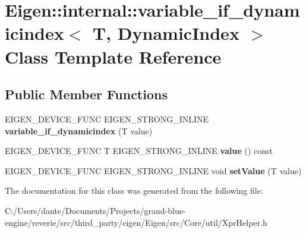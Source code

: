 \hypertarget{class_eigen_1_1internal_1_1variable__if__dynamicindex_3_01_t_00_01_dynamic_index_01_4}{}\section{Eigen\+::internal\+::variable\+\_\+if\+\_\+dynamicindex$<$ T, Dynamic\+Index $>$ Class Template Reference}
\label{class_eigen_1_1internal_1_1variable__if__dynamicindex_3_01_t_00_01_dynamic_index_01_4}
\subsection*{Public Member Functions}
\begin{DoxyCompactItemize}
\item 
\mbox{\label{class_eigen_1_1internal_1_1variable__if__dynamicindex_3_01_t_00_01_dynamic_index_01_4_a8c8e077721a51797efde13a37e49c376}} 
E\+I\+G\+E\+N\+\_\+\+D\+E\+V\+I\+C\+E\+\_\+\+F\+U\+NC E\+I\+G\+E\+N\+\_\+\+S\+T\+R\+O\+N\+G\+\_\+\+I\+N\+L\+I\+NE {\bfseries variable\+\_\+if\+\_\+dynamicindex} (T value)
\item 
\mbox{\label{class_eigen_1_1internal_1_1variable__if__dynamicindex_3_01_t_00_01_dynamic_index_01_4_a355b9b89ad0e85e71e392a015c9e9fca}} 
E\+I\+G\+E\+N\+\_\+\+D\+E\+V\+I\+C\+E\+\_\+\+F\+U\+NC T E\+I\+G\+E\+N\+\_\+\+S\+T\+R\+O\+N\+G\+\_\+\+I\+N\+L\+I\+NE {\bfseries value} () const
\item 
\mbox{\label{class_eigen_1_1internal_1_1variable__if__dynamicindex_3_01_t_00_01_dynamic_index_01_4_a486ec15d3596b14d8cab8da5aed14eea}} 
E\+I\+G\+E\+N\+\_\+\+D\+E\+V\+I\+C\+E\+\_\+\+F\+U\+NC E\+I\+G\+E\+N\+\_\+\+S\+T\+R\+O\+N\+G\+\_\+\+I\+N\+L\+I\+NE void {\bfseries set\+Value} (T value)
\end{DoxyCompactItemize}


The documentation for this class was generated from the following file\+:\begin{DoxyCompactItemize}
\item 
C\+:/\+Users/dante/\+Documents/\+Projects/grand-\/blue-\/engine/reverie/src/third\+\_\+party/eigen/\+Eigen/src/\+Core/util/Xpr\+Helper.\+h\end{DoxyCompactItemize}
